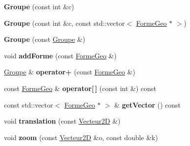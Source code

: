 \begin{DoxyCompactItemize}
\item 
\mbox{\label{class_groupe_af721765efd9e50abe98013b45ef6bf2a}} 
{\bfseries Groupe} (const int \&c)
\item 
\mbox{\label{class_groupe_ace78a66476c9cde9c48d90055141c350}} 
{\bfseries Groupe} (const int \&c, const std\+::vector$<$ \mbox{\hyperlink{class_forme_geo}{Forme\+Geo}} $\ast$ $>$)
\item 
\mbox{\label{class_groupe_adf726dba5919371e203f34441215ef2d}} 
{\bfseries Groupe} (const \mbox{\hyperlink{class_groupe}{Groupe}} \&)
\item 
\mbox{\label{class_groupe_a029603f9d3cf65ba62ca63e27080e889}} 
void {\bfseries add\+Forme} (const \mbox{\hyperlink{class_forme_geo}{Forme\+Geo}} \&)
\item 
\mbox{\label{class_groupe_a9a32f68d2641a629eef8066f15670ec0}} 
\mbox{\hyperlink{class_groupe}{Groupe}} \& {\bfseries operator+} (const \mbox{\hyperlink{class_forme_geo}{Forme\+Geo}} \&)
\item 
\mbox{\label{class_groupe_a5d6a13fd59c7e31b56de6e068d0eafdf}} 
const \mbox{\hyperlink{class_forme_geo}{Forme\+Geo}} \& {\bfseries operator\mbox{[}$\,$\mbox{]}} (const int \&) const
\item 
\mbox{\label{class_groupe_a36de94d4e7c5568b357d16315dcc5e66}} 
const std\+::vector$<$ \mbox{\hyperlink{class_forme_geo}{Forme\+Geo}} $\ast$ $>$ \& {\bfseries get\+Vector} () const
\item 
\mbox{\label{class_groupe_a8bbf8e8ee7f5228db3b2a2632ff4b03d}} 
void {\bfseries translation} (const \mbox{\hyperlink{class_vecteur2_d}{Vecteur2D}} \&)
\item 
\mbox{\label{class_groupe_afc723840f2ff25def30ffc46e5b49271}} 
void {\bfseries zoom} (const \mbox{\hyperlink{class_vecteur2_d}{Vecteur2D}} \&o, const double \&k)
\item 
\mbox{\label{class_groupe_a0e58d86afb3ea1467db7ad73780f4a6c}} 

\end{DoxyCompactItemize}
